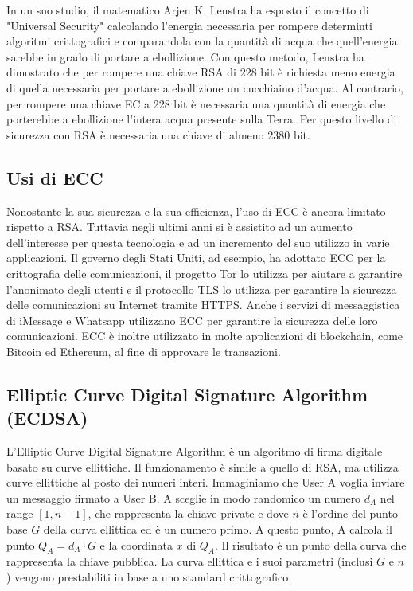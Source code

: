 \documentclass{article}
\begin{document}
In un suo studio, il matematico Arjen K. Lenstra ha esposto il concetto di "Universal Security" calcolando l'energia necessaria per rompere determinti algoritmi crittografici e comparandola con la quantità di acqua che quell'energia sarebbe in grado di portare a ebollizione.
Con questo metodo, Lenstra ha dimostrato che per rompere una chiave RSA di 228 bit è richiesta meno energia di quella necessaria per portare a ebollizione un cucchiaino d'acqua.
Al contrario, per rompere una chiave EC a 228 bit è necessaria una quantità di energia che porterebbe a ebollizione l'intera acqua presente sulla Terra.
Per questo livello di sicurezza con RSA è necessaria una chiave di almeno 2380 bit.

\subsection{Usi di ECC}
Nonostante la sua sicurezza e la sua efficienza, l'uso di ECC è ancora limitato rispetto a RSA.
Tuttavia negli ultimi anni si è assistito ad un aumento dell'interesse per questa tecnologia e ad un incremento del suo utilizzo in varie applicazioni.
Il governo degli Stati Uniti, ad esempio, ha adottato ECC per la crittografia delle comunicazioni, il progetto Tor lo utilizza per aiutare a garantire l'anonimato degli utenti e il protocollo TLS lo utilizza per garantire la sicurezza delle comunicazioni su Internet tramite HTTPS.
Anche i servizi di messaggistica di iMessage e Whatsapp utilizzano ECC per garantire la sicurezza delle loro comunicazioni.
ECC è inoltre utilizzato in molte applicazioni di blockchain, come Bitcoin ed Ethereum, al fine di approvare le transazioni.

\subsection{Elliptic Curve Digital Signature Algorithm (ECDSA)}
L'Elliptic Curve Digital Signature Algorithm è un algoritmo di firma digitale basato su curve ellittiche.
Il funzionamento è simile a quello di RSA, ma utilizza curve ellittiche al posto dei numeri interi.
Immaginiamo che User A voglia inviare un messaggio firmato a User B.
A sceglie in modo randomico un numero $d_A$ nel range $[1, n-1]$, che rappresenta la chiave private e dove $n$ è l'ordine del punto base $G$ della curva ellittica ed è un numero primo.
A questo punto, A calcola il punto $Q_A = d_A \cdot G$ e la coordinata $x$ di $Q_A$. Il risultato è un punto della curva che rappresenta la chiave pubblica.
La curva ellittica e i suoi parametri (inclusi $G$ e $n$) vengono prestabiliti in base a uno standard crittografico.
\end{document}
